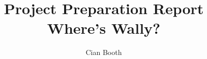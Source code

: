 \documentclass[a4paper,12pt]{article}
\author{Cian Booth}
\title{Project Preparation Report\\ Where's Wally?}
\begin{document}
	\maketitle
  \tableofcontents
  \pagebreak
  
  
\end{document}
